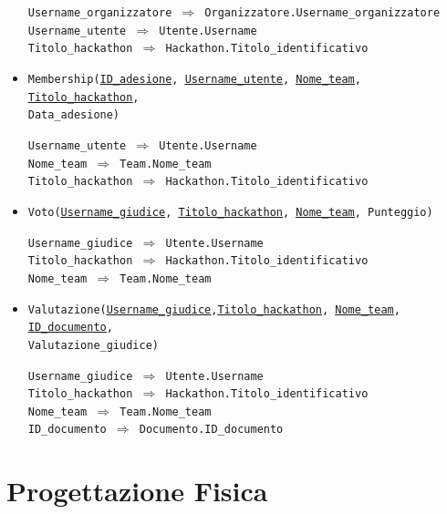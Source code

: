\documentclass[a4paper, 11pt]{article}
\begin{document}
\begin{itemize}
		\begin{graybox}
			\texttt{Username\_organizzatore $\Rightarrow$ Organizzatore.Username\_organizzatore} \\
			\texttt{Username\_utente $\Rightarrow$ Utente.Username}\\
			\texttt{Titolo\_hackathon $\Rightarrow$ Hackathon.Titolo\_identificativo}
		\end{graybox}
		\item \texttt{Membership(\underline{ID\_adesione}, \underline{\underline{Username\_utente}}, \underline{\underline{Nome\_team}}, \underline{\underline{Titolo\_hackathon}},\\Data\_adesione)}
		\begin{graybox}
			\texttt{Username\_utente $\Rightarrow$ Utente.Username}\\
			\texttt{Nome\_team $\Rightarrow$ Team.Nome\_team}\\
			\texttt{Titolo\_hackathon $\Rightarrow$ Hackathon.Titolo\_identificativo}
		\end{graybox}
		\item \texttt{Voto(\underline{\underline{Username\_giudice}}, \underline{\underline{Titolo\_hackathon}}, \underline{\underline{Nome\_team}}, Punteggio)}
		\begin{graybox}
			\texttt{Username\_giudice $\Rightarrow$ Utente.Username} \\
			\texttt{Titolo\_hackathon $\Rightarrow$ Hackathon.Titolo\_identificativo} \\
			\texttt{Nome\_team $\Rightarrow$ Team.Nome\_team}
		\end{graybox}
		\item \texttt{Valutazione(\underline{\underline{Username\_giudice}},\underline{\underline{Titolo\_hackathon}}, \underline{\underline{Nome\_team}}, \underline{\underline{ID\_documento}},\\Valutazione\_giudice)}
		\begin{graybox}
			\texttt{Username\_giudice $\Rightarrow$ Utente.Username} \\
			\texttt{Titolo\_hackathon $\Rightarrow$ Hackathon.Titolo\_identificativo} \\
			\texttt{Nome\_team $\Rightarrow$ Team.Nome\_team} \\
			\texttt{ID\_documento $\Rightarrow$ Documento.ID\_documento}
		\end{graybox}
	\end{itemize}
	\newpage
	\section{Progettazione Fisica}
\end{document}
